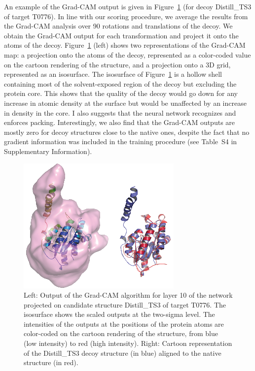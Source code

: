 \documentclass{bioinfo}
\begin{document}
An example of the Grad-CAM output is given in
Figure~\ref{Fig:GradCAMT0776} (for decoy Distill\_TS3 of target
T0776).  In line with our scoring procedure, we average the results
from the Grad-CAM analysis over 90 rotations and translations of the
decoy. We obtain the Grad-CAM output for each transformation and
project it onto the atoms of the decoy.  Figure~\ref{Fig:GradCAMT0776}
(left) shows two representations of the Grad-CAM map: a projection
onto the atoms of the decoy, represented as a color-coded value on the
cartoon rendering of the structure, and a projection onto a 3D grid,
represented as an isosurface. The isosurface of
Figure~\ref{Fig:GradCAMT0776} is a hollow shell containing most of the
solvent-exposed region of the decoy but excluding the protein
core. This shows that the quality of the decoy would go down for any
increase in atomic density at the surface but would be unaffected by
an increase in density in the core. I also suggests that the neural
network recognizes and enforces packing.  Interestingly, we also find
that the Grad-CAM outputs are mostly zero for decoy structures close
to the native ones, despite the fact that no gradient information was
included in the training procedure (see Table~S4 in Supplementary
Information).
%
\begin{figure}[H]
    \centering
    \includegraphics[width=\linewidth]{image6}
    \caption{Left: Output of the Grad-CAM algorithm for layer 10 of
      the network projected on candidate structure Distill\_TS3 of
      target T0776. The isosurface shows the scaled outputs at the
      two-sigma level. The intensities of the outputs at the positions
      of the protein atoms are color-coded on the cartoon rendering of
      the structure, from blue (low intensity) to red (high
      intensity). Right: Cartoon representation of the Distill\_TS3
      decoy structure (in blue) aligned to the native structure (in
      red).}
    \label{Fig:GradCAMT0776}
\end{figure}
\end{document}
